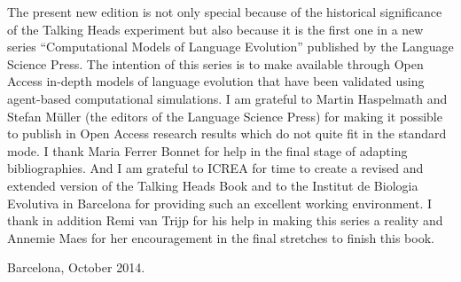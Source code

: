 The present new edition is not only special because of the historical significance of the Talking Heads 
experiment but also because it is the first one in a new series ``Computational Models of 
Language Evolution'' published by the Language Science Press. The intention of this series is to make available 
through Open Access in-depth models of language evolution that have been validated using agent-based 
computational simulations. I am grateful to Martin Haspelmath and Stefan M\"uller (the editors of the Language Science Press)
for making it possible to publish in Open Access research results which do not quite fit in the standard mode. I thank 
Maria Ferrer Bonnet for help in the final stage of adapting bibliographies. And I am grateful to ICREA for time to 
create a revised and extended version of the Talking Heads Book and to the Institut de Biologia Evolutiva in Barcelona 
for providing such an excellent working environment. I thank in addition Remi van Trijp for his help in making this series a reality 
and Annemie Maes for her encouragement in the final stretches to finish this book. 

\vspace{1cm}

\hfill Barcelona, October 2014.  


